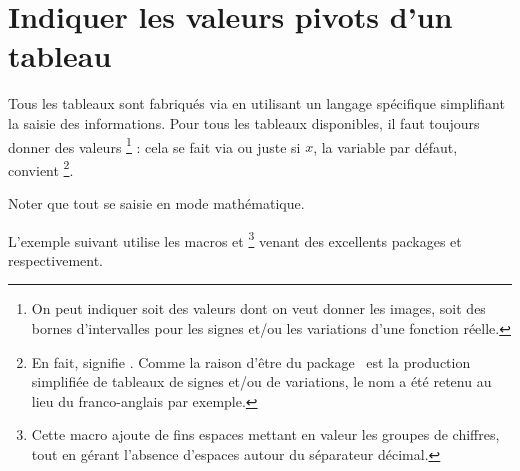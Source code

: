 \documentclass[10pt, a4paper]{article}
\begin{document}
\section{Indiquer les valeurs pivots d'un tableau}

Tous les tableaux sont fabriqués via  en utilisant un langage spécifique simplifiant la saisie des informations.
Pour tous les tableaux disponibles, il faut toujours donner des valeurs 
\footnote{
	 On peut indiquer soit des valeurs dont on veut donner les images, soit des bornes d'intervalles pour les signes et/ou les variations d'une fonction réelle.
} :
cela se fait via 
ou juste 
si $x$, la variable par défaut, convient
\footnote{
	En fait,  signifie .
	Comme la raison d'être du package \thispack\ est la production simplifiée de tableaux de signes et/ou de variations, le nom  a été retenu au lieu du franco-anglais  par exemple.
}.




\begin{tdocexa}
    Noter que tout se saisie en mode mathématique.

\end{tdocexa}




\begin{tdocexa}
    \leavevmode

\end{tdocexa}



\begin{tdocexa}
%
    L'exemple suivant utilise les macros  et 
    \footnote{
    	Cette macro ajoute de fins espaces mettant en valeur les groupes de chiffres, tout en gérant l'absence d'espaces autour du séparateur décimal.
    }
    venant des excellents packages  et  respectivement.

\end{tdocexa}
\end{document}
